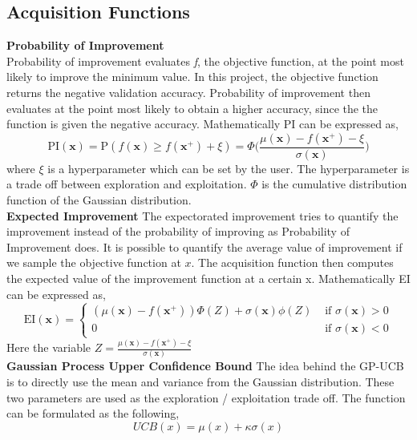 \documentclass[12pt,fleqn]{article}
\begin{document}
\subsection*{Acquisition Functions}

\textbf{Probability of Improvement} \\
Probability of improvement evaluates \textit{f}, the objective function, at the point most likely to improve the minimum value. In this project, the objective function returns the negative validation accuracy. Probability of improvement then evaluates at the point most likely to obtain a higher accuracy, since the the function is given the negative accuracy. Mathematically PI can be expressed as,
\begin{equation*}
	\text{PI}(\mathbf{x}) = \text{P}(f(\mathbf{x}) \geq f(\mathbf{x}^+) + \xi) 
	= \Phi\biggl(\frac{\mu(\mathbf{x}) - f(\mathbf{x}^+) - \xi}{\sigma(\mathbf{x})}\biggr)
\end{equation*}
\noindent
where $\xi$ is a hyperparameter which can be set by the user. The hyperparameter is a trade off between exploration and exploitation. $\Phi$ is the cumulative distribution function of the Gaussian distribution.
\newline \\
\textbf{Expected Improvement} \newline 
The expectorated improvement tries to quantify the improvement instead of the probability of improving as Probability of Improvement does. It is possible to quantify the average value of improvement if we sample the objective function at $ x $. The acquisition function then computes the expected value of the improvement function at a certain x. Mathematically EI can be expressed as, 
\begin{equation*}
\mathrm{EI}(\mathbf{x})=\left\{\begin{array}{ll}
\left(\mu(\mathbf{x})-f\left(\mathbf{x}^{+}\right)\right) \Phi(Z)+\sigma(\mathbf{x}) \phi(Z) & \text { if } \sigma(\mathbf{x})>0 \\
0 & \text { if } \sigma(\mathbf{x})<0
\end{array}\right.
\end{equation*}
Here the variable $ Z = \frac{\mu(\mathbf{x}) - f(\mathbf{x}^+) - \xi }{\sigma(\mathbf{x})} $ \newline 
\\
\textbf{Gaussian Process Upper Confidence Bound} \newline
The idea behind the GP-UCB is to directly use the mean and variance from the Gaussian distribution. These two parameters are used as the exploration / exploitation trade off. The function can be formulated as the following, 
\begin{equation*}
UCB(x) = \mu(x) + \kappa \sigma(x)
\end{equation*}
\end{document}
